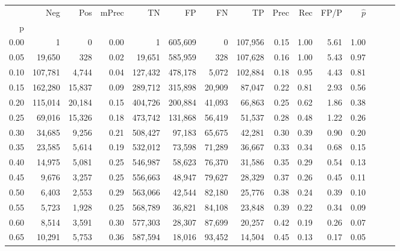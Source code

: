 \begin{tabular}{rrrrrrrrrrrrrrr}
\toprule
{} &      Neg &     Pos & mPrec &       TN &       FP &       FN &       TP &  Prec &   Rec &  FP/P & $\hat{p}$ \\
p    &          &         &       &          &          &          &          &       &       &       &           \\
\midrule
0.00 &        1 &       0 &  0.00 &        1 &  605,609 &        0 &  107,956 &  0.15 &  1.00 &  5.61 &      1.00 \\
0.05 &   19,650 &     328 &  0.02 &   19,651 &  585,959 &      328 &  107,628 &  0.16 &  1.00 &  5.43 &      0.97 \\
0.10 &  107,781 &   4,744 &  0.04 &  127,432 &  478,178 &    5,072 &  102,884 &  0.18 &  0.95 &  4.43 &      0.81 \\
0.15 &  162,280 &  15,837 &  0.09 &  289,712 &  315,898 &   20,909 &   87,047 &  0.22 &  0.81 &  2.93 &      0.56 \\
0.20 &  115,014 &  20,184 &  0.15 &  404,726 &  200,884 &   41,093 &   66,863 &  0.25 &  0.62 &  1.86 &      0.38 \\
0.25 &   69,016 &  15,326 &  0.18 &  473,742 &  131,868 &   56,419 &   51,537 &  0.28 &  0.48 &  1.22 &      0.26 \\
0.30 &   34,685 &   9,256 &  0.21 &  508,427 &   97,183 &   65,675 &   42,281 &  0.30 &  0.39 &  0.90 &      0.20 \\
0.35 &   23,585 &   5,614 &  0.19 &  532,012 &   73,598 &   71,289 &   36,667 &  0.33 &  0.34 &  0.68 &      0.15 \\
0.40 &   14,975 &   5,081 &  0.25 &  546,987 &   58,623 &   76,370 &   31,586 &  0.35 &  0.29 &  0.54 &      0.13 \\
0.45 &    9,676 &   3,257 &  0.25 &  556,663 &   48,947 &   79,627 &   28,329 &  0.37 &  0.26 &  0.45 &      0.11 \\
0.50 &    6,403 &   2,553 &  0.29 &  563,066 &   42,544 &   82,180 &   25,776 &  0.38 &  0.24 &  0.39 &      0.10 \\
0.55 &    5,723 &   1,928 &  0.25 &  568,789 &   36,821 &   84,108 &   23,848 &  0.39 &  0.22 &  0.34 &      0.09 \\
0.60 &    8,514 &   3,591 &  0.30 &  577,303 &   28,307 &   87,699 &   20,257 &  0.42 &  0.19 &  0.26 &      0.07 \\
0.65 &   10,291 &   5,753 &  0.36 &  587,594 &   18,016 &   93,452 &   14,504 &  0.45 &  0.13 &  0.17 &      0.05 \\

\end{tabular}
